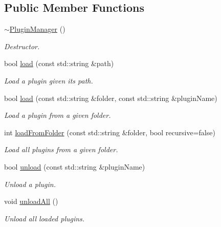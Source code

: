 \subsection*{Public Member Functions}
\begin{DoxyCompactItemize}
\item 
\hyperlink{classpluma_1_1_plugin_manager_a4d7a0e1151b75300350834a59db5748b}{$\sim$\+Plugin\+Manager} ()\hypertarget{classpluma_1_1_plugin_manager_a4d7a0e1151b75300350834a59db5748b}{}\label{classpluma_1_1_plugin_manager_a4d7a0e1151b75300350834a59db5748b}

\begin{DoxyCompactList}\small\item\em Destructor. \end{DoxyCompactList}\item 
bool \hyperlink{classpluma_1_1_plugin_manager_aa00400d23efa8a8f94e44dd1c5bf54e6}{load} (const std\+::string \&path)
\begin{DoxyCompactList}\small\item\em Load a plugin given it\textquotesingle{}s path. \end{DoxyCompactList}\item 
bool \hyperlink{classpluma_1_1_plugin_manager_a866127044950094bb789260bc15a2874}{load} (const std\+::string \&folder, const std\+::string \&plugin\+Name)
\begin{DoxyCompactList}\small\item\em Load a plugin from a given folder. \end{DoxyCompactList}\item 
int \hyperlink{classpluma_1_1_plugin_manager_a4d892e345288c26dea091d62ee2b03eb}{load\+From\+Folder} (const std\+::string \&folder, bool recursive=false)
\begin{DoxyCompactList}\small\item\em Load all plugins from a given folder. \end{DoxyCompactList}\item 
bool \hyperlink{classpluma_1_1_plugin_manager_a52f6408d4cf95c6f36b518ab2d3a7745}{unload} (const std\+::string \&plugin\+Name)
\begin{DoxyCompactList}\small\item\em Unload a plugin. \end{DoxyCompactList}\item 
void \hyperlink{classpluma_1_1_plugin_manager_a697a20dc97957e0c2a5dad33f39d93db}{unload\+All} ()
\begin{DoxyCompactList}\small\item\em Unload all loaded plugins. \end{DoxyCompactList}\item 

\end{DoxyCompactItemize}
